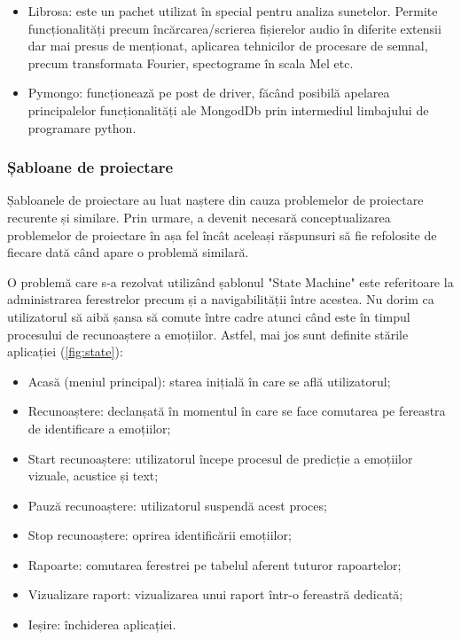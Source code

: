 \documentclass[a4paper, 12pt]{report}
\begin{document}
\begin{itemize}
		\item Librosa: este un pachet utilizat în special pentru analiza sunetelor. Permite funcționalități precum încărcarea/scrierea fișierelor audio în diferite extensii dar mai presus de menționat, aplicarea tehnicilor de procesare de semnal, precum transformata Fourier, spectograme în scala Mel etc.
	
		\item Pymongo: funcționează pe post de driver, făcând posibilă apelarea principalelor funcționalități ale MongodDb prin intermediul limbajului de programare python.
	\end{itemize}
	
	\subsubsection{Șabloane de proiectare}
	Șabloanele de proiectare au luat naștere din cauza problemelor de proiectare recurente și similare. Prin urmare, a devenit necesară conceptualizarea problemelor de proiectare în așa fel încât aceleași răspunsuri să fie refolosite de fiecare dată când apare o problemă similară.

	O problemă care s-a rezolvat utilizând șablonul "State Machine" este referitoare la administrarea ferestrelor precum și a navigabilității între acestea. Nu dorim ca utilizatorul să aibă șansa să comute între cadre atunci când este în timpul procesului de recunoaștere a emoțiilor. Astfel, mai jos sunt definite stările aplicației (\ref{fig:state}): 
	
	\begin{itemize}
		\item Acasă (meniul principal): starea inițială în care se află utilizatorul;
		\item Recunoaștere: declanșată în momentul în care se face comutarea pe fereastra de identificare a emoțiilor;
		\item Start recunoaștere: utilizatorul începe procesul de predicție a emoțiilor vizuale, acustice și text;
		\item Pauză recunoaștere: utilizatorul suspendă acest proces;
		\item Stop recunoaștere: oprirea identificării emoțiilor;
		\item Rapoarte: comutarea ferestrei pe tabelul aferent tuturor rapoartelor;
		\item Vizualizare raport: vizualizarea unui raport într-o fereastră dedicată;
		\item Ieșire: închiderea aplicației.
	\end{itemize}
\end{document}

